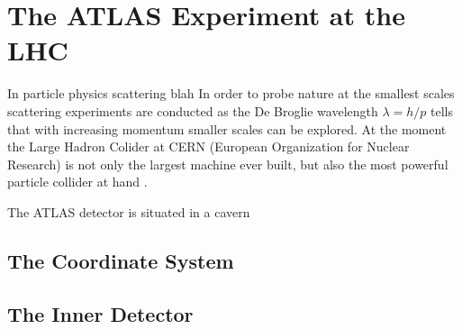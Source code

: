\chapter{The ATLAS Experiment at the LHC}

In particle physics scattering blah
In order to probe nature at the smallest scales scattering experiments are conducted as the De Broglie wavelength $\lambda=h/p$ tells that with increasing momentum smaller scales can be explored. At the moment the Large Hadron Colider at CERN (European Organization for Nuclear Research) is not only the largest machine ever built, but also the most powerful particle collider at hand .


The ATLAS detector is situated in a cavern 

\section{The Coordinate System}

\section{The Inner Detector}


